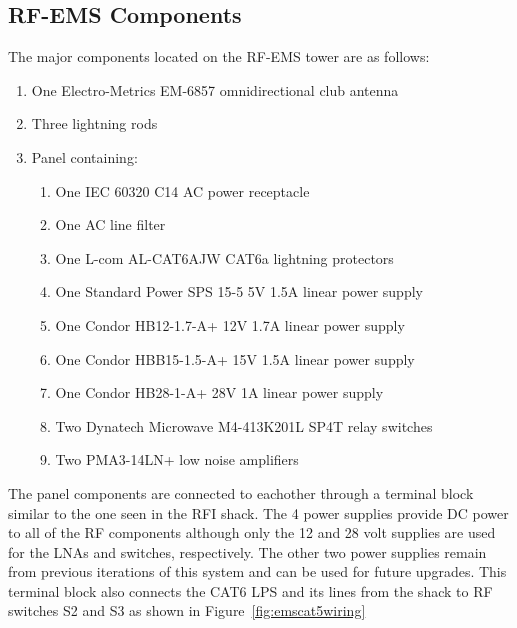\documentclass[titlepage]{article}
\begin{document}
\subsection{RF-EMS Components}\label{sec:higems}
The major components located on the RF-EMS tower are as follows:
\begin{enumerate}
  \item One Electro-Metrics EM-6857 omnidirectional club antenna
  \item Three lightning rods
  \item Panel containing:
  \begin{enumerate}
    \item One IEC 60320 C14 AC power receptacle
    \item One AC line filter
    \item One L-com AL-CAT6AJW CAT6a lightning protectors
    \item One Standard Power SPS 15-5 5V 1.5A linear power supply
    \item One Condor HB12-1.7-A+ 12V 1.7A linear power supply
    \item One Condor HBB15-1.5-A+ 15V 1.5A linear power supply
    \item One Condor HB28-1-A+ 28V 1A linear power supply
    \item Two Dynatech Microwave M4-413K201L SP4T relay switches
    \item Two PMA3-14LN+ low noise amplifiers
  \end{enumerate}
\end{enumerate}
The panel components are connected to eachother through a terminal block similar to the one seen in the RFI shack. The 4 power supplies provide DC power to all of the RF components although only the 12 and 28 volt supplies are used for the LNAs and switches, respectively. The other two power supplies remain from previous iterations of this system and can be used for future upgrades. This terminal block also connects the CAT6 LPS and its lines from the shack to RF switches S2 and S3 as shown in Figure~\ref{fig:emscat5wiring}
\end{document}
